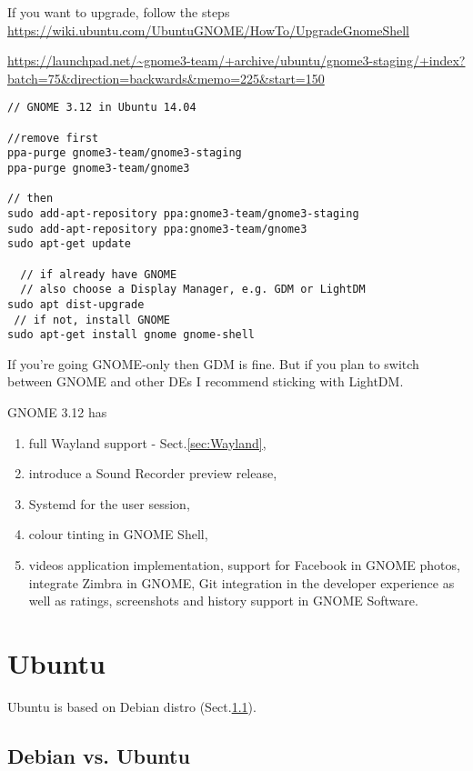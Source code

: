 If you want to upgrade, follow the steps
\url{https://wiki.ubuntu.com/UbuntuGNOME/HowTo/UpgradeGnomeShell}

\url{https://launchpad.net/~gnome3-team/+archive/ubuntu/gnome3-staging/+index?batch=75&direction=backwards&memo=225&start=150}
\begin{verbatim}
// GNOME 3.12 in Ubuntu 14.04

//remove first
ppa-purge gnome3-team/gnome3-staging
ppa-purge gnome3-team/gnome3

// then
sudo add-apt-repository ppa:gnome3-team/gnome3-staging
sudo add-apt-repository ppa:gnome3-team/gnome3
sudo apt-get update

  // if already have GNOME
  // also choose a Display Manager, e.g. GDM or LightDM
sudo apt dist-upgrade
 // if not, install GNOME
sudo apt-get install gnome gnome-shell
\end{verbatim}

If you're going GNOME-only then GDM is fine. But if you plan to switch between
GNOME and other DEs I recommend sticking with LightDM.


GNOME 3.12 has
\begin{enumerate}
  \item full Wayland support - Sect.\ref{sec:Wayland},
  
  \item introduce a Sound Recorder preview release, 
  
  \item Systemd for the user session, 
  
  \item colour tinting in GNOME Shell, 
  
  \item videos application implementation, support for Facebook in GNOME photos,
  integrate Zimbra in GNOME, Git integration in the developer experience as well
  as ratings, screenshots and history support in GNOME Software.
\end{enumerate}


\chapter{Ubuntu}

Ubuntu is based on Debian distro (Sect.\ref{sec:Debian}).

\section{Debian vs. Ubuntu}
\label{sec:Debian}


